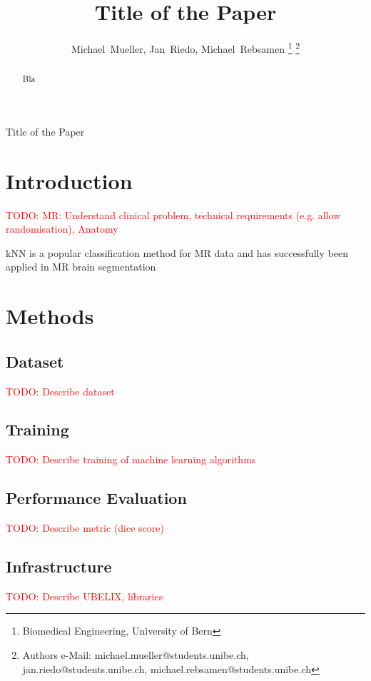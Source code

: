 \documentclass[journal]{IEEEtran}
\newcommand\TODO[1]{\textcolor{red}{TODO: #1}}
\begin{document}
\title{Title of the Paper}


\author{Michael~Mueller,
        Jan~Riedo,
        Michael~Rebsamen%
\thanks{Biomedical Engineering, University of Bern}%
\thanks{Authors e-Mail: michael.mueller@students.unibe.ch, jan.riedo@students.unibe.ch, michael.rebsamen@students.unibe.ch}}%
%
{Title of the Paper}
\maketitle

\begin{abstract}
Bla
\end{abstract}

\section{Introduction}
\TODO{MR: Understand clinical problem, technical requirements (e.g. allow randomisation), Anatomy}

kNN is a popular classification method for MR data and has successfully been applied in MR brain segmentation\cite{Anbeek2004,Cocosco2003,Warfield2000}


\section{Methods}

\subsection{Dataset}
\TODO{Describe dataset}

\subsection{Training}
\TODO{Describe training of machine learning algorithms}

\subsection{Performance Evaluation}
\TODO{Describe metric (dice score)}

\subsection{Infrastructure}
\TODO{Describe UBELIX, libraries}
\end{document}
